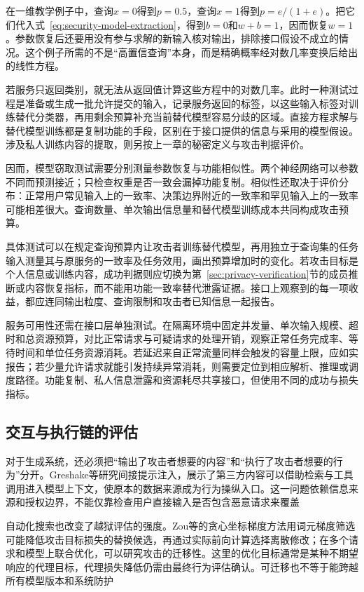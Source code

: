 在一维教学例子中，查询$x=0$得到$p=0.5$，查询$x=1$得到$p=e/(1+e)$。把它们代入式~\eqref{eq:security-model-extraction}，得到$b=0$和$w+b=1$，因而恢复$w=1$。参数恢复后还要用没有参与求解的新输入核对输出，排除接口假设不成立的情况。这个例子所需的不是“高置信查询”本身，而是精确概率经对数几率变换后给出的线性方程。

若服务只返回类别，就无法从返回值计算这些方程中的对数几率。此时一种测试过程是准备或生成一批允许提交的输入，记录服务返回的标签，以这些输入标签对训练替代分类器，再用剩余预算补充当前替代模型容易分歧的区域。直接方程求解与替代模型训练都是复制功能的手段，区别在于接口提供的信息与采用的模型假设。涉及私人训练内容的提取，则另按上一章的秘密定义与攻击判据评价。

因而，模型窃取测试需要分别测量参数恢复与功能相似性。两个神经网络可以参数不同而预测接近；只检查权重是否一致会漏掉功能复制。相似性还取决于评价分布：正常用户常见输入上的一致率、决策边界附近的一致率和罕见输入上的一致率可能相差很大。查询数量、单次输出信息量和替代模型训练成本共同构成攻击预算。

具体测试可以在规定查询预算内让攻击者训练替代模型，再用独立于查询集的任务输入测量其与原服务的一致率及任务效用，画出预算增加时的变化。若攻击目标是个人信息或训练内容，成功判据则应切换为第~\ref{sec:privacy-verification}节的成员推断或内容恢复指标，而不能用功能一致率替代泄露证据。接口上观察到的每一项收益，都应连同输出粒度、查询限制和攻击者已知信息一起报告。

服务可用性还需在接口层单独测试。在隔离环境中固定并发量、单次输入规模、超时和总资源预算，对比正常请求与可疑请求的处理开销，观察正常任务完成率、等待时间和单位任务资源消耗。若延迟来自正常流量同样会触发的容量上限，应如实报告；若少量允许请求就能引发持续异常消耗，则需要定位到相应解析、推理或调度路径。功能复制、私人信息泄露和资源耗尽共享接口，但使用不同的成功与损失指标。

\subsection{交互与执行链的评估}
\label{sec:security-interaction-test}

对于生成系统，还必须把“输出了攻击者想要的内容”和“执行了攻击者想要的行为”分开。Greshake等研究间接提示注入，展示了第三方内容可以借助检索与工具调用进入模型上下文，使原本的数据来源成为行为操纵入口。这一问题依赖信息来源和授权边界，不能仅靠检查用户直接输入是否包含恶意请求来覆盖

自动化搜索也改变了越狱评估的强度。Zou等的贪心坐标梯度方法用词元梯度筛选可能降低攻击目标损失的替换候选，再通过实际前向计算选择离散修改；在多个请求和模型上联合优化，可以研究攻击的迁移性。这里的优化目标通常是某种不期望响应的代理目标，代理损失降低仍需由最终行为评估确认。可迁移也不等于能跨越所有模型版本和系统防护

